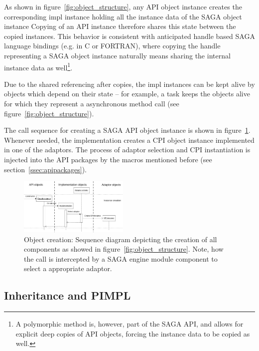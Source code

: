 As shown in figure~\ref{fig:object_structure}, any API object instance creates
the corresponding impl instance holding all the instance data
of the SAGA object instance 
Copying of an API instance therefore shares this state between the copied 
instances.
This behavior is consistent with anticipated handle based SAGA language bindings 
(e.g. in C or FORTRAN), where copying the handle representing a SAGA 
object instance naturally means sharing the internal instance data as 
well\footnote{\small A polymorphic  method is, however, part 
of the SAGA API, and allows for explicit deep copies of API objects, 
forcing the instance data to be copied as well.}.  

Due to the shared
referencing after copies, the impl instances can be kept alive by objects
which depend on their state -- for example, a task keeps the objects
alive for which they represent a asynchronous method call (see
figure~\ref{fig:object_structure}).

The call sequence for creating a SAGA API object instance is shown in
figure~\ref{fig:object_creation}.  Whenever needed, the implementation
creates a CPI object instance implemented in one of the adaptors.
The process of adaptor selection and CPI instantiation is injected into the 
API packages by the macros mentioned before (see section~\ref{ssec:apipackages}).

\begin{figure}[!ht]
 \begin{center}
  \includegraphics[width=0.47\textwidth]{images/object_lifetime_creation}
  \up
  \caption{\label{fig:object_creation}
    Object creation: Sequence diagram depicting the creation of all
    components as showed in figure~\ref{fig:object_structure}. Note, how
    the call is intercepted by a SAGA engine module component to select 
    a appropriate adaptor.}
 \end{center}
\end{figure}

\up
\up
\subsection{Inheritance and PIMPL}

